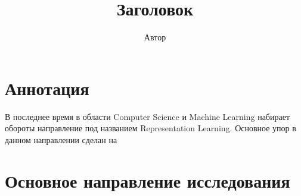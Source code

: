 \documentclass[a4paper,14pt]{article}
\title{Заголовок}
\author{Автор}
\begin{document}
\section*{Аннотация}
В последнее время в области Computer Science и Machine Learning набирает обороты  направление под названием Representation Learning. Основное упор в данном направлении сделан на 
\section*{Основное направление исследования}
\end{document}
